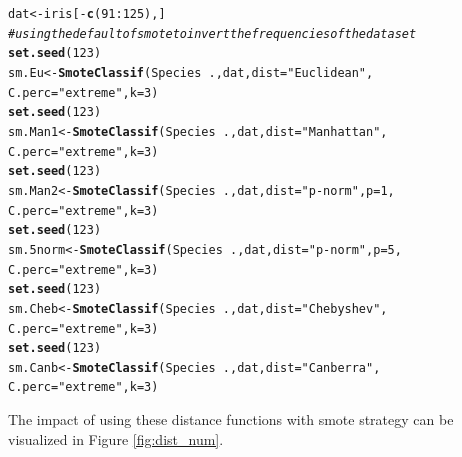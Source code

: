 \documentclass[10pt,a4paper]{article}\usepackage[]{graphicx}\usepackage[]{color}
\makeatletter
\newcommand{\hlnum}[1]{\textcolor[rgb]{0.686,0.059,0.569}{#1}}%
\newcommand{\hlstr}[1]{\textcolor[rgb]{0.192,0.494,0.8}{#1}}%
\newcommand{\hlcom}[1]{\textcolor[rgb]{0.678,0.584,0.686}{\textit{#1}}}%
\newcommand{\hlopt}[1]{\textcolor[rgb]{0,0,0}{#1}}%
\newcommand{\hlstd}[1]{\textcolor[rgb]{0.345,0.345,0.345}{#1}}%
\newcommand{\hlkwb}[1]{\textcolor[rgb]{0.69,0.353,0.396}{#1}}%
\newcommand{\hlkwc}[1]{\textcolor[rgb]{0.333,0.667,0.333}{#1}}%
\newcommand{\hlkwd}[1]{\textcolor[rgb]{0.737,0.353,0.396}{\textbf{#1}}}%
\newenvironment{kframe}{%
 \def\at@end@of@kframe{}%
 \ifinner\ifhmode%
  \def\at@end@of@kframe{\end{minipage}}%
  \begin{minipage}{\columnwidth}%
 \fi\fi%
 \def\FrameCommand##1{\hskip\@totalleftmargin \hskip-\fboxsep
 \colorbox{shadecolor}{##1}\hskip-\fboxsep
     \hskip-\linewidth \hskip-\@totalleftmargin \hskip\columnwidth}%
 \MakeFramed {\advance\hsize-\width
   \@totalleftmargin\z@ \linewidth\hsize
   \@setminipage}}%
 {\par\unskip\endMakeFramed%
 \at@end@of@kframe}
\newenvironment{knitrout}{}{} %
\makeatother
\begin{document}
\begin{knitrout}\footnotesize
{}\color{fgcolor}\begin{kframe}
\begin{alltt}
\hlstd{dat} \hlkwb{<-} \hlstd{iris[}\hlopt{-}\hlkwd{c}\hlstd{(}\hlnum{91}\hlopt{:}\hlnum{125}\hlstd{),]}
\hlcom{# using the default of smote to invert the frequencies of the data set}
\hlkwd{set.seed}\hlstd{(}\hlnum{123}\hlstd{)}
\hlstd{sm.Eu} \hlkwb{<-} \hlkwd{SmoteClassif}\hlstd{(Species}\hlopt{~}\hlstd{., dat,} \hlkwc{dist}\hlstd{=}\hlstr{"Euclidean"}\hlstd{,}
                      \hlkwc{C.perc}\hlstd{=}\hlstr{"extreme"}\hlstd{,} \hlkwc{k}\hlstd{=}\hlnum{3}\hlstd{)}
\hlkwd{set.seed}\hlstd{(}\hlnum{123}\hlstd{)}
\hlstd{sm.Man1} \hlkwb{<-} \hlkwd{SmoteClassif}\hlstd{(Species}\hlopt{~}\hlstd{., dat,} \hlkwc{dist}\hlstd{=}\hlstr{"Manhattan"}\hlstd{,}
                        \hlkwc{C.perc}\hlstd{=}\hlstr{"extreme"}\hlstd{,} \hlkwc{k}\hlstd{=}\hlnum{3}\hlstd{)}
\hlkwd{set.seed}\hlstd{(}\hlnum{123}\hlstd{)}
\hlstd{sm.Man2} \hlkwb{<-} \hlkwd{SmoteClassif}\hlstd{(Species}\hlopt{~}\hlstd{., dat,} \hlkwc{dist}\hlstd{=}\hlstr{"p-norm"}\hlstd{,} \hlkwc{p}\hlstd{=}\hlnum{1}\hlstd{,}
                        \hlkwc{C.perc}\hlstd{=}\hlstr{"extreme"}\hlstd{,} \hlkwc{k}\hlstd{=}\hlnum{3}\hlstd{)}
\hlkwd{set.seed}\hlstd{(}\hlnum{123}\hlstd{)}
\hlstd{sm.5norm} \hlkwb{<-} \hlkwd{SmoteClassif}\hlstd{(Species}\hlopt{~}\hlstd{., dat,} \hlkwc{dist}\hlstd{=}\hlstr{"p-norm"}\hlstd{,} \hlkwc{p}\hlstd{=}\hlnum{5}\hlstd{,}
                         \hlkwc{C.perc}\hlstd{=}\hlstr{"extreme"}\hlstd{,} \hlkwc{k}\hlstd{=}\hlnum{3}\hlstd{)}
\hlkwd{set.seed}\hlstd{(}\hlnum{123}\hlstd{)}
\hlstd{sm.Cheb} \hlkwb{<-} \hlkwd{SmoteClassif}\hlstd{(Species}\hlopt{~}\hlstd{., dat,} \hlkwc{dist}\hlstd{=}\hlstr{"Chebyshev"}\hlstd{,}
                        \hlkwc{C.perc}\hlstd{=}\hlstr{"extreme"}\hlstd{,} \hlkwc{k}\hlstd{=}\hlnum{3}\hlstd{)}
\hlkwd{set.seed}\hlstd{(}\hlnum{123}\hlstd{)}
\hlstd{sm.Canb} \hlkwb{<-} \hlkwd{SmoteClassif}\hlstd{(Species}\hlopt{~}\hlstd{., dat,} \hlkwc{dist}\hlstd{=}\hlstr{"Canberra"}\hlstd{,}
                        \hlkwc{C.perc}\hlstd{=}\hlstr{"extreme"}\hlstd{,} \hlkwc{k}\hlstd{=}\hlnum{3}\hlstd{)}
\end{alltt}
\end{kframe}
\end{knitrout}

The impact of using these distance functions with smote strategy can be visualized in Figure \ref{fig:dist_num}.
\end{document}

